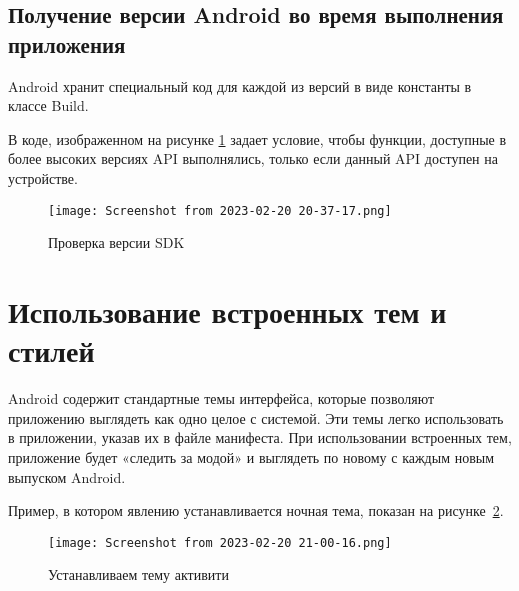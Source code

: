 \subsection{Получение версии Android во время выполнения приложения}
Android хранит специальный код для каждой из версий в виде константы в
классе Build.\par
В коде, изображенном на рисунке \ref{fig:code:vsdk} задает условие,
чтобы функции, доступные в более высоких версиях API выполнялись,
только если данный API доступен на устройстве.
\begin{figure}[h!tp]
	\centering
	\texttt{[image: Screenshot from 2023-02-20 20-37-17.png]}
	\caption{Проверка версии SDK}
	\label{fig:code:vsdk}
\end{figure}

\section{Использование встроенных тем и стилей}
Android содержит стандартные темы интерфейса, которые позволяют
приложению выглядеть как одно целое с системой. Эти темы легко
использовать в приложении, указав их в файле манифеста. При
использовании встроенных тем, приложение будет «следить за модой» и
выглядеть по новому с каждым новым выпуском Android.\par
Пример, в котором явлению устанавливается ночная тема,
показан на рисунке~\ref{fig:manifest:theme}.
\begin{figure}[h!tp]
	\centering
	\texttt{[image: Screenshot from 2023-02-20 21-00-16.png]}
	\caption{Устанавливаем тему активити}
	\label{fig:manifest:theme}
\end{figure}

